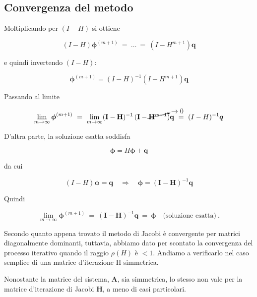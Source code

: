 %
\subsection{Convergenza del metodo}

Moltiplicando per $(I - H)$ si ottiene

\begin{equation*}
	(I - H)\boldsymbol{\phi}^{(m+1)}\ =\ \dots \ =\ (I - H^{m+1}) \boldsymbol{q}
\end{equation*}

e quindi invertendo $(I-H)$:

\begin{equation*}
	\boldsymbol{\phi}^{(m+1)} = (I - H)^{-1} (I - H^{m+1}) \boldsymbol{q}
\end{equation*}

Passando al limite

\begin{equation*}
	\lim_{m \to \infty} \boldsymbol{\phi}^{(m+1)} \ =\  
	\lim_{m \to \infty} (\mathbf I - \mathbf H)^{-1}\, (\mathbf I-\cancelto{\rightarrow 0}{\mathbf H^{m+1}})\mathbf q
	\ =\
	(I - H)^{-1} \boldsymbol{q}
\end{equation*}

D'altra parte, la soluzione esatta soddisfa

\begin{equation*}
	\boldsymbol{\phi} = H \boldsymbol{\phi} + \boldsymbol{q}
\end{equation*}

da cui

\begin{equation*}
	(I - H)\boldsymbol{\phi} = \boldsymbol{q}
	\quad \Rightarrow \quad
	\boldsymbol{\phi} = (\mathbf I -\mathbf H)^{-1} \boldsymbol{q}
\end{equation*}

Quindi

\begin{equation*}
	\lim_{m \to \infty} \boldsymbol{\phi}^{(m+1)}\ =\
	(\mathbf I -\mathbf H)^{-1} \boldsymbol{q}
	\ =\ 
	 \boldsymbol{\phi} \quad \text{(soluzione esatta)}\ .
\end{equation*}

Secondo quanto appena trovato il metodo di Jacobi è convergente per matrici diagonalmente dominanti, tuttavia, abbiamo dato per scontato la convergenza del processo iterativo quando il raggio $\rho (H)$ è $<1$. Andiamo a verificarlo nel caso semplice di una matrice d'iterazione H simmetrica.

Nonostante la matrice del sistema, $\mathbf A$, sia simmetrica, lo stesso non vale per la matrice d'iterazione di Jacobi $\mathbf H$, a meno di casi particolari.

